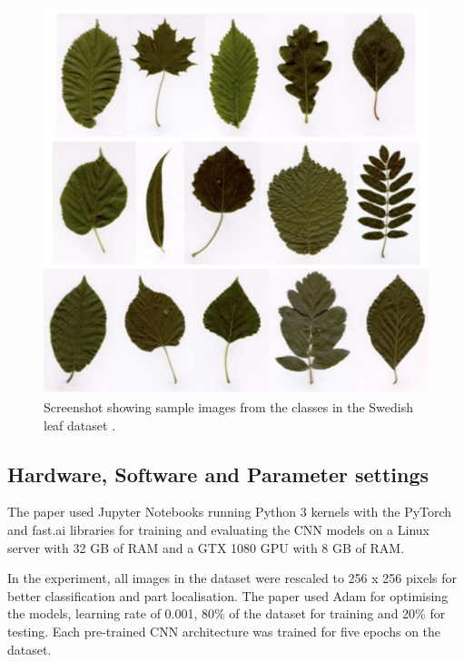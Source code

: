 \documentclass[conference]{IEEEtran}
\begin{document}
    \begin{figure}
   

        
        \centerline{\includegraphics[scale=0.25]{figures/Screenshot 2021-11-25 at 13.34.07.png}}
         \caption{Screenshot showing sample images from the classes in the Swedish leaf dataset \cite{soderkvist2001computer}.}

        \label{fig:gate4}
    \end{figure}




    

\subsection{Hardware, Software and Parameter settings}
The paper used Jupyter Notebooks \cite{kluyver2016jupyter} running Python 3 kernels with the PyTorch \cite{paszke2017automatic} and fast.ai \cite{howard2018fastai} libraries for training and evaluating the CNN models on a Linux server with 32 GB of RAM and a GTX 1080 GPU with 8 GB of RAM.

In the experiment, all images in the dataset were rescaled to 256 x 256 pixels for better classification and part localisation. The paper used Adam \cite{kingma2014adam} for optimising the models, learning rate of 0.001, 80\% of the dataset for training and 20\% for testing. Each pre-trained CNN architecture was trained for five epochs on the dataset.
\end{document}
